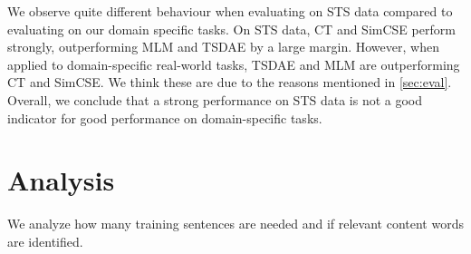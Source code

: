\documentclass[11pt]{article}
\begin{document}
\begin{table}[h]
\centering
{}
\caption{Performance (Spearman's rank correlation) on the STS benchmark test set. Specific tasks: Average performance from \autoref{tbl:main_results}.}
\label{tbl:sts_results}
\end{table}


We observe quite different behaviour when evaluating on STS data compared to evaluating on our domain specific tasks. On STS data, CT and SimCSE perform strongly, outperforming MLM and TSDAE by a large margin. However, when applied to domain-specific real-world tasks, TSDAE and MLM are outperforming CT and SimCSE. We think these are due to the reasons mentioned in \autoref{sec:eval}. Overall, we conclude that a strong performance on STS data is not a good indicator for good performance on domain-specific tasks.



\section{Analysis}
\label{sec:analysis}
We analyze how many training sentences are needed and if relevant content words are identified.
\end{document}
